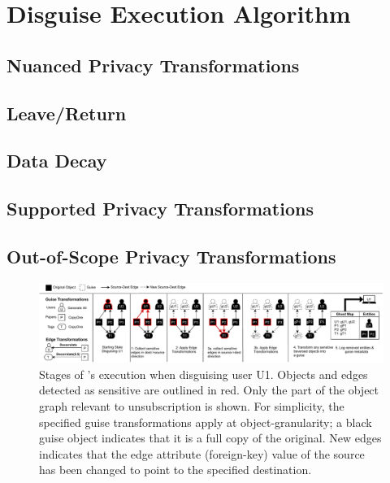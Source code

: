 \section{Disguise Execution Algorithm}

\subsection{Nuanced Privacy Transformations}

\subsection{Leave/Return}

\subsection{Data Decay}

\subsection{Supported Privacy Transformations}

\subsection{Out-of-Scope Privacy Transformations}

\begin{figure}[ht!]
    \centering
    \includegraphics[width=\textwidth]{img/algo}

    \caption{Stages of \sys's execution when disguising user U1. Objects and edges detected as
    sensitive are outlined in red. Only the part of the object graph relevant to unsubscription is
    shown.  For simplicity, the specified guise transformations apply at object-granularity; a black
    guise object indicates that it is a full copy of the original.  New edges indicates that the
    edge attribute (foreign-key) value of the source has been changed to point to the specified destination.\\
    }
    \label{fig:algo}
\end{figure}

